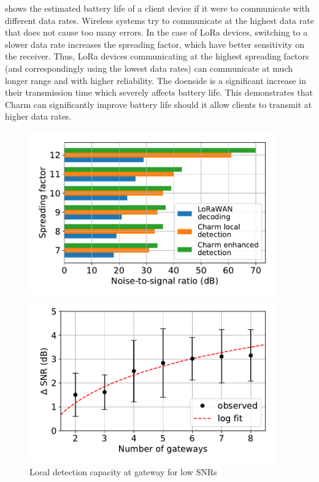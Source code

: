  shows the estimated battery life of a client device if it were to communicate with different data rates. Wireless systems try to communicate at the highest data rate that does not cause too many errors. In the case of LoRa devices, switching to a slower data rate increases the spreading factor,  which have better sensitivity on the receiver. Thus, LoRa devices communicating at the highest spreading factors (and correspondingly using the lowest data rates) can communicate at much longer range and with higher reliability. The doenside is a significant increase in their transmission time which severely affects battery life. This demonstrates that Charm can significantly improve battery life should it allow clients to transmit at higher data rates. 

\begin{figure}
\hfill
\begin{minipage}{.32\textwidth}
\centering
\includegraphics[width=0.95\textwidth]{figures/local_detection_limits}
\hspace*{-0.1in}
\caption{Local detection capacity at gateway for low SNRs}
\label{fig:local-detection}
\compactimg
\end{minipage}
\hfill
\begin{minipage}{.32\textwidth}
\centering
\includegraphics[width=0.95\textwidth]{figures/diversity_gain}

\end{minipage}
\end{figure}
